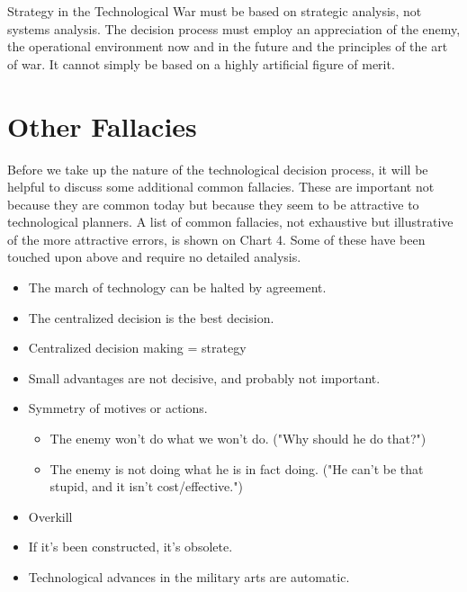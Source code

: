 Strategy in the Technological War must be based on strategic analysis, not systems analysis. The decision process must employ an appreciation of the enemy, the operational environment now and in the future and the principles of the art of war. It cannot simply be based on a highly artificial figure of merit.

\section{Other Fallacies}
Before we take up the nature of the technological decision process, it will be helpful to discuss some additional common fallacies. These are important not because they are common today but because they seem to be attractive to technological planners. A list of common fallacies, not exhaustive but illustrative of the more attractive errors, is shown on Chart 4. Some of these have been touched upon above and require no detailed analysis.

\medskip

\begin{mdframed}[nobreak=true, frametitle={CHART FOUR: Common Fallacies About Technology}]
   \begin{itemize}
        \item The march of technology can be halted by agreement.
        \item The centralized decision is the best decision.
        \item Centralized decision making = strategy
        \item Small advantages are not decisive, and probably not important.
        \item Symmetry of motives or actions.
        \begin{itemize}
            \item The enemy won't do what we won't do. ("Why should he do that?")
            \item The enemy is not doing what he is in fact doing. ("He can't be that stupid, and it isn't cost/effective.")
        \end{itemize}
        \item Overkill
        \item If it's been constructed, it's obsolete.
        \item Technological advances in the military arts are automatic.
   \end{itemize}
\end{mdframed}   

